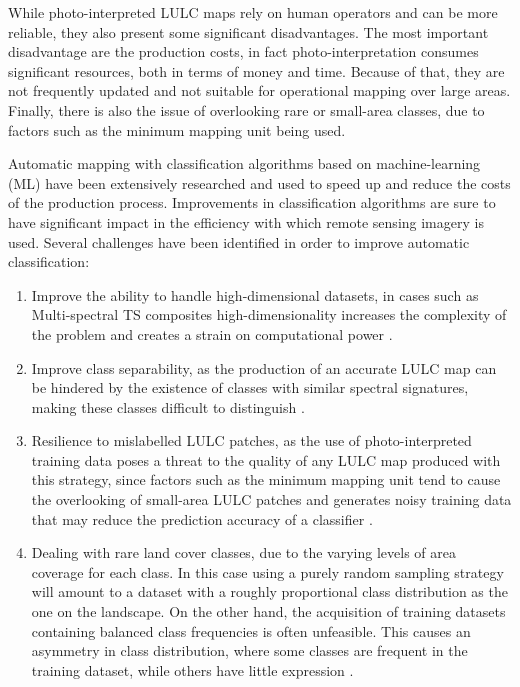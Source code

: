 \documentclass[parskip=full]{scrartcl}
\begin{document}
While photo-interpreted LULC maps rely on human operators and can be more
reliable, they also present some significant disadvantages. The most important
disadvantage are the production costs, in fact photo-interpretation consumes
significant resources, both in terms of money and time. Because of that, they are not
frequently updated and not suitable for operational mapping over large areas.
Finally, there is also the issue of overlooking rare or small-area classes, due
to factors such as the minimum mapping unit being used.

Automatic mapping with classification algorithms based on machine-learning (ML)
have been extensively researched and used to speed up and reduce the costs of
the production process. Improvements in classification algorithms are sure to
have significant impact in the efficiency with which remote sensing imagery is
used. Several challenges have been identified in order to improve automatic
classification:

\begin{enumerate}
    \item Improve the ability to handle high-dimensional datasets, in cases such
        as Multi-spectral TS composites high-dimensionality increases the
        complexity of the problem and creates a strain on computational power
        \cite{Stromann2020}.
    \item Improve class separability, as the production of an accurate LULC map
        can be hindered by the existence of classes with similar spectral
        signatures, making these classes difficult to distinguish
        \cite{Alonso-Sarria2019}.
    \item Resilience to mislabelled LULC patches, as the use of
        photo-interpreted training data poses a threat to the quality of any
        LULC map produced with this strategy, since factors such as the minimum
        mapping unit tend to cause the overlooking of small-area LULC patches
        and generates noisy training data that may reduce the prediction
        accuracy of a classifier \cite{Pelletier2017}.
    \item Dealing with rare land cover classes, due to the varying levels of
        area coverage for each class. In this case using a purely random
        sampling strategy will amount to a dataset with a roughly proportional
        class distribution as the one on the landscape. On the other hand, the
        acquisition of training datasets containing balanced class frequencies
        is often unfeasible. This causes an asymmetry in class distribution,
        where some classes are frequent in the training dataset, while others
        have little expression \cite{Wang2019, Feng2019}.
\end{enumerate}
\end{document}
